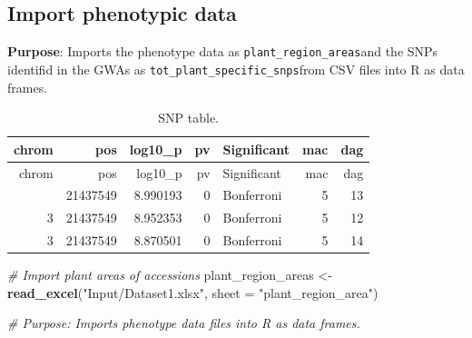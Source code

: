 \documentclass[
  11pt,
]{article}
\newenvironment{Shaded}{\begin{snugshade}}{\end{snugshade}}
\newcommand{\AttributeTok}[1]{\textcolor[rgb]{0.13,0.29,0.53}{#1}}
\newcommand{\CommentTok}[1]{\textcolor[rgb]{0.56,0.35,0.01}{\textit{#1}}}
\newcommand{\ConstantTok}[1]{\textcolor[rgb]{0.56,0.35,0.01}{#1}}
\newcommand{\DecValTok}[1]{\textcolor[rgb]{0.00,0.00,0.81}{#1}}
\newcommand{\FunctionTok}[1]{\textcolor[rgb]{0.13,0.29,0.53}{\textbf{#1}}}
\newcommand{\NormalTok}[1]{#1}
\newcommand{\OtherTok}[1]{\textcolor[rgb]{0.56,0.35,0.01}{#1}}
\newcommand{\SpecialCharTok}[1]{\textcolor[rgb]{0.81,0.36,0.00}{\textbf{#1}}}
\newcommand{\StringTok}[1]{\textcolor[rgb]{0.31,0.60,0.02}{#1}}
\begin{document}
\subsection{Import phenotypic data}\label{import-phenotypic-data}

\textbf{Purpose}: Imports the phenotype data as
\texttt{plant\_region\_areas}and the SNPs identifid in the GWAs as
\texttt{tot\_plant\_specific\_snps}from CSV files into R as data frames.

\begin{Shaded}
\end{Shaded}

\begin{longtable}[]{@{}rrrrlrr@{}}
\caption{SNP table.}\tabularnewline
\toprule\noalign{}
chrom & pos & log10\_p & pv & Significant & mac & dag \\
\midrule\noalign{}
\endfirsthead
\toprule\noalign{}
chrom & pos & log10\_p & pv & Significant & mac & dag \\
\midrule\noalign{}
\endhead
\bottomrule\noalign{}
\endlastfoot
3 & 21437549 & 8.990193 & 0 & Bonferroni & 5 & 13 \\
3 & 21437549 & 8.952353 & 0 & Bonferroni & 5 & 12 \\
3 & 21437549 & 8.870501 & 0 & Bonferroni & 5 & 14 \\
\end{longtable}

\begin{Shaded}
\begin{Highlighting}[]
\CommentTok{\# Import plant areas of accessions}
\NormalTok{plant\_region\_areas }\OtherTok{\textless{}{-}} \FunctionTok{read\_excel}\NormalTok{(}\StringTok{"Input/Dataset1.xlsx"}\NormalTok{, }\AttributeTok{sheet =} \StringTok{"plant\_region\_area"}\NormalTok{)}

\CommentTok{\# Purpose: Imports phenotype data files into R as data frames.}
\end{Highlighting}
\end{Shaded}
\end{document}
